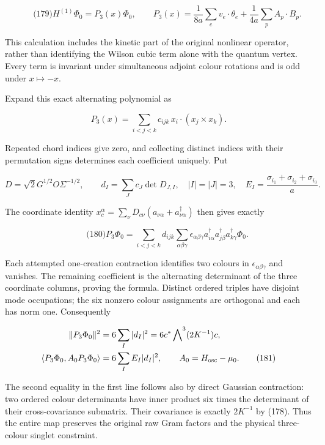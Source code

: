 \[
\qquad\text{(179)}
 H^{(1)}\Phi_0=P_3(x)\Phi_0,\qquad
 P_3(x)=\frac1{8a}\sum_e v_e\cdot\theta_e
                      +\frac1{4a}\sum_p A_p\cdot B_p.
\]

This calculation includes the kinetic part of the original nonlinear
operator, rather than identifying the Wilson cubic term alone with the
quantum vertex. Every term is invariant under simultaneous adjoint
colour rotations and is odd under \(x\mapsto-x\).

Expand this exact alternating polynomial as

\[
P_3(x)=\sum_{i<j<k}c_{ijk}\,
                 x_i\cdot(x_j\times x_k).
\]

Repeated chord indices give zero, and collecting distinct indices with
their permutation signs determines each coefficient uniquely. Put

\[
D=\sqrt2G^{1/2}O\Sigma^{-1/2},\qquad
 d_I=\sum_J c_J\det D_{J,I},\quad |I|=|J|=3,
 \quad E_I=\frac{\sigma_{i_1}+\sigma_{i_2}+\sigma_{i_3}}a.
\]

The coordinate identity \(x_c^\alpha=\sum_\nu D_{c\nu}
(a_{\nu\alpha}+a^\dagger_{\nu\alpha})\) then gives exactly

\[
\qquad\text{(180)}
 P_3\Phi_0=\sum_{i<j<k}d_{ijk}\sum_{\alpha\beta\gamma}
   \epsilon_{\alpha\beta\gamma}
   a^\dagger_{i\alpha}a^\dagger_{j\beta}a^\dagger_{k\gamma}\Phi_0.
\]

Each attempted one-creation contraction identifies two colours in
\(\epsilon_{\alpha\beta\gamma}\) and vanishes. The remaining coefficient
is the alternating determinant of the three coordinate columns, proving
the formula. Distinct ordered triples have disjoint mode occupations;
the six nonzero colour assignments are orthogonal and each has norm one.
Consequently

\[
\begin{aligned}
 \|P_3\Phi_0\|^2&=6\sum_I|d_I|^2
       =6c^*\bigwedge\nolimits^3(2K^{-1})c,\\
 \langle P_3\Phi_0,A_0P_3\Phi_0\rangle&=6\sum_I E_I|d_I|^2,
 \qquad A_0=H_{\rm osc}-\mu_0 .\qquad\text{(181)}
\end{aligned}
\]

The second equality in the first line follows also by direct Gaussian
contraction: two ordered colour determinants have inner product six
times the determinant of their cross-covariance submatrix. Their
covariance is exactly \(2K^{-1}\) by (178). Thus the entire map
preserves the original raw Gram factors and the physical three-colour
singlet constraint.

